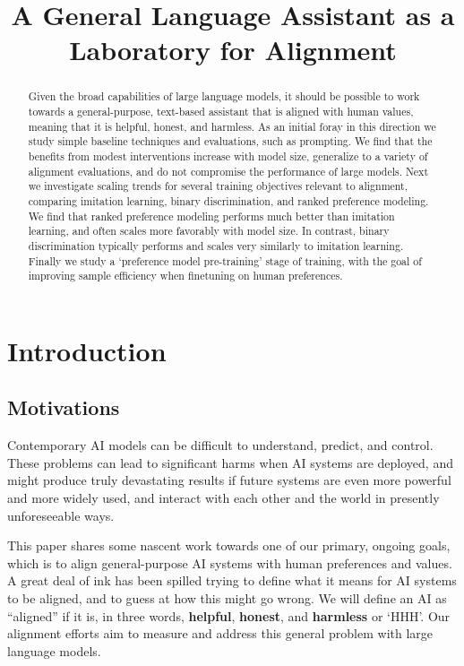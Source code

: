 \title{A General Language Assistant as a Laboratory for Alignment}

\begin{abstract}
Given the broad capabilities of large language models, it should be possible to work towards a general-purpose, text-based assistant that is aligned with human values, meaning that it is helpful, honest, and harmless.  As an initial foray in this direction we study simple baseline techniques and evaluations, such as prompting.  We find that the benefits from modest interventions increase with model size, generalize to a variety of  alignment evaluations, and do not compromise the performance of large models.  Next we investigate scaling trends for several training objectives relevant to alignment, comparing imitation learning, binary discrimination, and ranked preference modeling.  We find that ranked preference modeling performs much better than imitation learning, and often scales more favorably with model size.  In contrast, binary discrimination typically performs and scales very similarly to imitation learning.  Finally we study a `preference model pre-training' stage of training, with the goal of improving sample efficiency when finetuning on human preferences.
\end{abstract}

\section{Introduction}

\subsection{Motivations}

Contemporary AI models can be difficult to understand, predict, and control.  These problems can lead to significant harms when AI systems are deployed, and might produce truly devastating results if future systems are even more powerful and more widely used, and interact with each other and the world in presently unforeseeable ways.

This paper shares some nascent work towards one of our primary, ongoing goals, which is to align general-purpose AI systems with human preferences and values.  A great deal of ink has been spilled trying to define what it means for AI systems to be aligned, and to guess at how this might go wrong.  We will define an AI as ``aligned'' if it is, in three words, {\bf helpful}, {\bf honest}, and {\bf harmless} or `HHH'.  Our alignment efforts  aim to measure and address this general problem with large language models.

